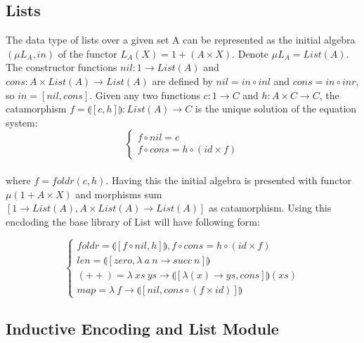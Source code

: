 \documentclass[11pt,oneside]{article}
\begin{document}
\newpage
  \subsection{Lists}
  The data type of lists over a given set A can be represented as the initial algebra
  $(\mu L_A, in)$ of the functor $L_A(X) = 1 + (A \times X)$. Denote $\mu L_A = List(A)$.
  The constructor functions $nil: 1 \rightarrow List(A)$ and
  $cons: A \times List(A) \rightarrow List(A)$ are defined by
  $nil = in \circ inl$ and $cons = in \circ inr$, so $in = [nil,cons]$.
  Given any two functions $c: 1 \rightarrow C$ and $h: A \times C \rightarrow C$,
  the catamorphism $f = \llparenthesis [c,h] \rrparenthesis : List(A) \rightarrow C$
  is the unique solution of the equation system:
\vspace{0.3cm}
$$
\begin{cases}
  f \circ nil  = c \\
  f \circ cons = h \circ (id \times f)
\end{cases}
$$

\paragraph{}
  where $f = foldr(c,h)$. Having this the initial algebra is presented with functor
  $\mu (1 + A \times X)$ and morphisms sum $[1 \rightarrow List(A), A \times List(A) \rightarrow List(A)]$
  as catamorphism. Using this encdoding the base library of List will have following form:

\vspace{0.5cm}
$$
\begin{cases}
 foldr = \llparenthesis [ f \circ nil , h] \rrparenthesis, f \circ cons = h \circ (id \times f)\\
 len = \llparenthesis [ zero, \lambda\ a\ n \rightarrow succ\ n ] \rrparenthesis \\
 (++) = \lambda\ xs\ ys \rightarrow \llparenthesis [ \lambda (x) \rightarrow ys, cons ] \rrparenthesis (xs) \\
 map = \lambda\ f \rightarrow \llparenthesis [ nil, cons \circ (f \times id)] \rrparenthesis
\end{cases}
$$

\vspace{0.2cm}
\subsection{Inductive Encoding and List Module}
\vspace{0.4cm}
\end{document}

